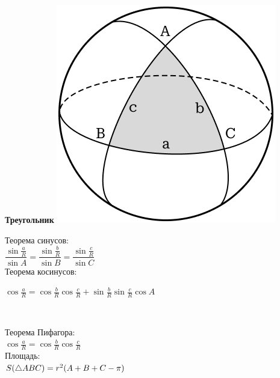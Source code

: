     \begin{minipage}[t]{0.25\textwidth}
        \begin{center}
            \textbf{Треугольник}
            \includegraphics[width=0.75\linewidth]{images/img4}\\
        \end{center}
        Теорема синусов:\\
        $\dfrac{\sin\frac{a}{R}}{\sin A} = \dfrac{\sin\frac{b}{R}}{\sin B} = \dfrac{\sin\frac{c}{R}}{\sin C}$\\

        Теорема косинусов:
        \begin{spacing}{1.2}
            $\cos\frac{a}{R} = \cos\frac{b}{R}\cos\frac{c}{R} + \sin\frac{b}{R}\sin\frac{c}{R}\cos A$
        \end{spacing}\

        Теорема Пифагора:\\
        $\cos\frac{a}{R}=\cos\frac{b}{R}\cos\frac{c}{R}$\\

        Площадь:\\
        $S(\triangle ABC)=\\r^2(A + B + C - \pi)$

    \end{minipage}




